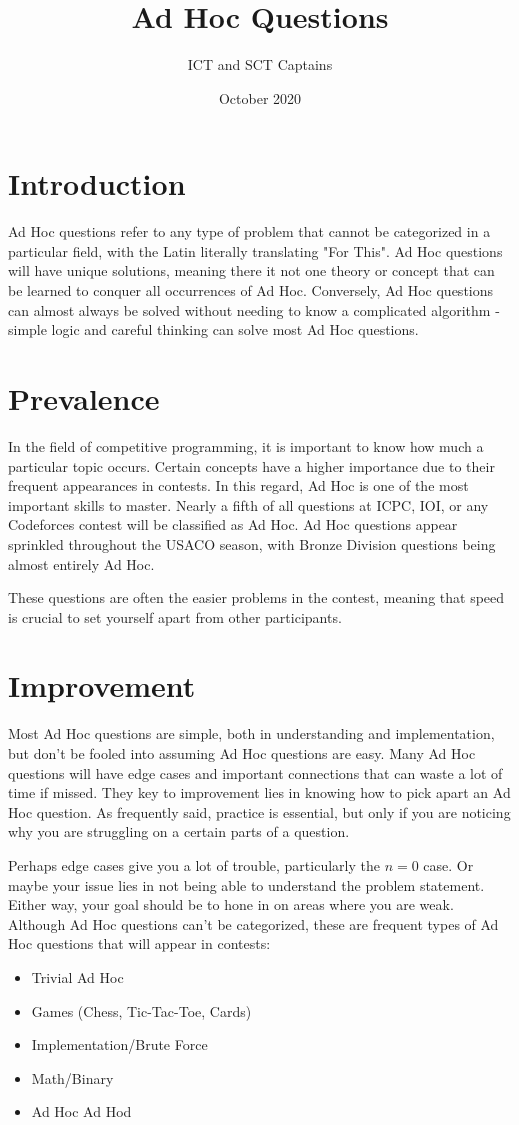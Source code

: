 \documentclass{article}
\title{Ad Hoc Questions}
\author{ICT and SCT Captains}
\date{October 2020}
\begin{document}
\maketitle

\section{Introduction}
    Ad Hoc questions refer to any type of problem that cannot be categorized in a particular field, with the Latin literally translating "For This". Ad Hoc questions will have unique solutions, meaning there it not one theory or concept that can be learned to conquer all occurrences of Ad Hoc. Conversely, Ad Hoc questions can almost always be solved without needing to know a complicated algorithm - simple logic and careful thinking can solve most Ad Hoc questions.
    
\section{Prevalence}
    In the field of competitive programming, it is important to know how much a particular topic occurs. Certain concepts have a higher importance due to their frequent appearances in contests. In this regard, Ad Hoc is one of the most important skills to master. Nearly a fifth of all questions at ICPC, IOI, or any Codeforces contest will be classified as Ad Hoc. Ad Hoc questions appear sprinkled throughout the USACO season, with Bronze Division questions being almost entirely Ad Hoc.
    
    These questions are often the easier problems in the contest, meaning that speed is crucial to set yourself apart from other participants.

\section{Improvement}
    Most Ad Hoc questions are simple, both in understanding and implementation, but don't be fooled into assuming Ad Hoc questions are easy. Many Ad Hoc questions will have edge cases and important connections that can waste a lot of time if missed. They key to improvement lies in knowing how to pick apart an Ad Hoc question. As frequently said, practice is essential, but only if you are noticing why you are struggling on a certain parts of a question.
    
    Perhaps edge cases give you a lot of trouble, particularly the $n = 0$ case. Or maybe your issue lies in not being able to understand the problem statement. Either way, your goal should be to hone in on areas where you are weak.
    \medbreak
    Although Ad Hoc questions can't be categorized, these are frequent types of Ad Hoc questions that will appear in contests:
    \begin{itemize}
        \item Trivial Ad Hoc
        \item Games (Chess, Tic-Tac-Toe, Cards)
        \item Implementation/Brute Force
        \item Math/Binary
        \item Ad Hoc Ad Hod
    \end{itemize}
\end{document}
